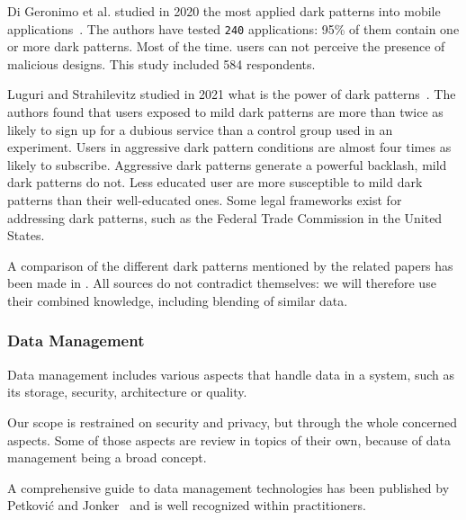 Di Geronimo et al. studied in 2020 the most applied dark patterns into mobile applications~\cite{di_geronimo_ui_2020}. The authors have tested \texttt{240}  applications: 95\% of them contain one or more dark patterns. Most of the time. users can not perceive the presence of malicious designs. This study included 584 respondents. %

Luguri and Strahilevitz studied in 2021 what is the power of dark patterns~\cite{luguri_shining_2021}. The authors found that users exposed to mild dark patterns are more than twice as likely to sign up for a dubious service than a control group used in an experiment. Users in aggressive dark pattern conditions are almost four times as likely to subscribe. Aggressive dark patterns generate a powerful backlash, mild dark patterns do not. Less educated user are more susceptible to mild dark patterns than their well-educated ones. Some legal frameworks exist for addressing dark patterns, such as the Federal Trade Commission in the United States. %

A comparison of the different dark patterns mentioned by the related papers has been made in . All sources do not contradict themselves: we will therefore use their combined knowledge, including blending of similar data.

\subsubsection{Data Management}
\label{subsubsec:state_review_results_datamanagement}

Data management includes various aspects that handle data in a system, such as its storage, security, architecture or quality. 

Our scope is restrained on security and privacy, but through the whole concerned aspects. Some of those aspects are review in topics of their own, because of data management being a broad concept.

A comprehensive guide to data management technologies has been published by Petković and Jonker~\cite{petkovic_security_2007} and is well recognized within practitioners. 

